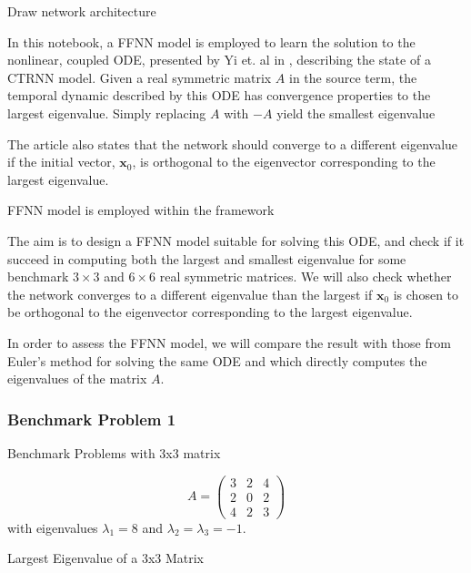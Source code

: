 Draw network architecture 

In this notebook, a FFNN model is employed to learn the solution to the nonlinear, coupled ODE, presented by Yi et. al in \cite{yfh04}, describing the state of a CTRNN model. Given a real symmetric matrix $A$ in the source term, the temporal dynamic described by this ODE has convergence properties to the largest eigenvalue. Simply replacing $A$ with $-A$ yield the smallest eigenvalue

The article also states that the network should converge to a different eigenvalue if the initial vector, $\mathbf{x}_0$, is orthogonal to the eigenvector corresponding to the largest eigenvalue.

FFNN model is employed within the  framework


The aim is to design a FFNN model suitable for solving this ODE, and check if it succeed in computing both the largest and smallest eigenvalue for some benchmark $3\times 3$ and $6\times 6$ real symmetric matrices. We will also check whether the network converges to a different eigenvalue than the largest if $\mathbf{x}_0$ is chosen to be orthogonal to the eigenvector corresponding to the largest eigenvalue. 

In order to assess the FFNN model, we will compare the result with those from Euler's method for solving the same ODE and   which directly computes the eigenvalues of the matrix $A$.

\subsubsection{Benchmark Problem 1}\label{sec:benchmark problem 1}
Benchmark Problems with 3x3 matrix

\begin{equation}\label{eq:33mat}
    A = \left(\begin{array}{ccc}
        3 & 2 & 4  \\
        2 & 0 & 2  \\
        4 & 2 & 3
    \end{array}\right)
\end{equation}
with eigenvalues $\lambda_1 = 8$ and $\lambda_2 = \lambda_3 = -1$.

Largest Eigenvalue of a 3x3 Matrix

